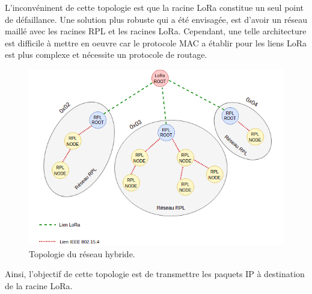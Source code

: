L'inconvéninent de cette topologie est que la racine LoRa constitue un seul point de défaillance. Une solution plus robuste qui a été envisagée, est d'avoir un réseau maillé avec les racines RPL et les racines LoRa. Cependant, une telle architecture est difficile à mettre en oeuvre car le protocole MAC a établir pour les liens LoRa est plus complexe et nécessite un protocole de routage.

\begin{figure}[H]
    \centering
    \includegraphics[scale=0.7]{res/pictures/loramac-topologie.drawio.png}
    \caption{Topologie du réseau hybride.}
    \label{fig:archi-topologie}
\end{figure}

Ainsi, l'objectif de cette topologie est de transmettre les paquets IP à destination de la racine LoRa.